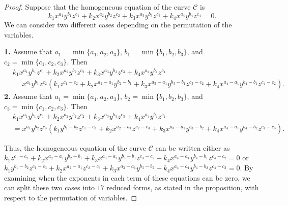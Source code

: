 \documentclass[preprint,12pt]{elsarticle}
\begin{document}
\begin{proof}
  Suppose that the homogeneous equation of the curve $\mathcal{C}$ is  
$$
k_{1}x^{a_{1}}y^{b_{1}}z^{c_{1}} + k_{2}x^{a_{2}}y^{b_{2}}z^{c_{2}} + k_{3}x^{a_{3}}y^{b_{3}}z^{c_{3}} + k_{4}x^{a_{4}}y^{b_{4}}z^{c_{4}} = 0.
$$
We can consider two different cases depending on the permutation of the variables.

\medskip
\noindent
\textbf{1.} Assume that $a_{1} = \min\{a_{1},a_{2},a_{3}\}$, $b_{1} = \min\{b_{1},b_{2},b_{3}\}$, and $c_{2} = \min\{c_{1},c_{2},c_{3}\}$. Then  
\begin{equation*}
\begin{aligned}
    &k_{1}x^{a_{1}}y^{b_{1}}z^{c_{1}} + k_{2}x^{a_{2}}y^{b_{2}}z^{c_{2}} + k_{3}x^{a_{3}}y^{b_{3}}z^{c_{3}}  + k_{4}x^{a_{4}}y^{b_{4}}z^{c_{4}}\\
&= x^{a_{1}}y^{b_{1}}z^{c_{2}}\left( k_{1}z^{c_{1}-c_{2}} + k_{2}x^{a_{2}-a_{1}}y^{b_{2}-b_{1}} + k_{3}x^{a_{3}-a_{1}}y^{b_{3}-b_{1}}z^{c_{3}-c_{2}  } + k_{4}x^{a_{4}-a_{1}}y^{b_{4}-b_{1}}z^{c_{4}-c_{2}} \right).
\end{aligned}
\end{equation*}
\medskip
\noindent
\textbf{2.} Assume that $a_{1} = \min\{a_{1},a_{2},a_{3}\}$, $b_{2} = \min\{b_{1},b_{2},b_{3}\}$, and $c_{3} = \min\{c_{1},c_{2},c_{3}\}$. Then  
\begin{equation*}
\begin{aligned}
    &k_{1}x^{a_{1}}y^{b_{1}}z^{c_{1}} + k_{2}x^{a_{2}}y^{b_{2}}z^{c_{2}} + k_{3}x^{a_{3}}y^{b_{3}}z^{c_{3}} +
k_{4}x^{a_{4}}y^{b_{4}}z^{c_{4}}\\
&= x^{a_{1}}y^{b_{2}}z^{c_{3}}\left( k_{1}y^{b_{1}-b_{2}}z^{c_{1}-c_{3}} + k_{2}x^{a_{2}-a_{1}}z^{c_{2}-c_{3}} + k_{3}x^{a_{3}-a_{1}}y^{b_{3}-b_{2}} + k_4x^{a_{4}-a_{1}}y^{b_{4}-b_{2}}z^{c_{4}-c_{3}}\right).
\end{aligned}
\end{equation*}

Thus, the homogeneous equation of the curve $\mathcal{C}$ can be written either as  
$
k_{1}z^{c_{1}-c_{2}} + k_{2}x^{a_{2}-a_{1}}y^{b_{2}-b_{1}} + k_{3}x^{a_{3}-a_{1}}y^{b_{3}-b_{1}}z^{c_{3}-c_{2}  } + k_{4}x^{a_{4}-a_{1}}y^{b_{4}-b_{1}}z^{c_{4}-c_{2}} = 0
$
or  
$
 k_{1}y^{b_{1}-b_{2}}z^{c_{1}-c_{3}} + k_{2}x^{a_{2}-a_{1}}z^{c_{2}-c_{3}} + k_{3}x^{a_{3}-a_{1}}y^{b_{3}-b_{2}} + k_4x^{a_{4}-a_{1}}y^{b_{4}-b_{2}}z^{c_{4}-c_{3}} = 0$. By examining when the exponents in each term of these equations can be zero, we can split these two cases into $17$ reduced forms, as stated in the proposition, with respect to the permutation of variables.
\end{proof}
\end{document}

